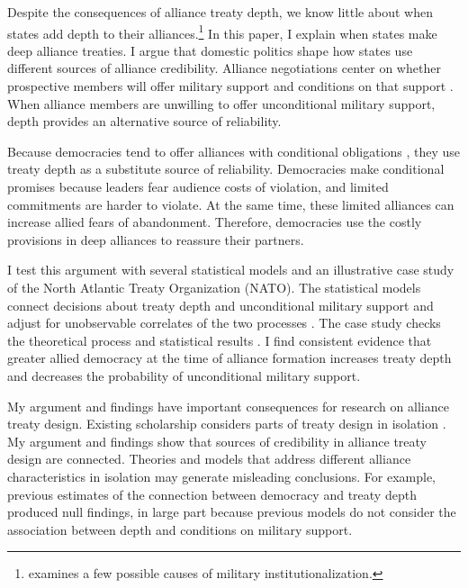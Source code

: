 \documentclass[12pt]{article}
\begin{document}
Despite the consequences of alliance treaty depth, we know little about when states add depth to their alliances.\footnote{\citet{Mattes2012} examines a few possible causes of military institutionalization.}
In this paper, I explain when states make deep alliance treaties.
I argue that domestic politics shape how states use different sources of alliance credibility. 
Alliance negotiations center on whether prospective members will offer military support and conditions on that support \citep{Poast2019a}. 
When alliance members are unwilling to offer unconditional military support, depth provides an alternative source of reliability.%


Because democracies tend to offer alliances with conditional obligations \citep{Mattes2012, Chibaetal2015}, they use treaty depth as a substitute source of reliability. 
Democracies make conditional promises because leaders fear audience costs of violation, and limited commitments are harder to violate.
At the same time, these limited alliances can increase allied fears of abandonment. 
Therefore, democracies use the costly provisions in deep alliances to reassure their partners.   


I test this argument with several statistical models and an illustrative case study of the North Atlantic Treaty Organization (NATO).
The statistical models connect decisions about treaty depth and unconditional military support and adjust for unobservable correlates of the two processes \citep{Braumoelleretal2018}. 
The case study checks the theoretical process and statistical results \citep{SeawrightGerring2008, Seawright2016}. 
I find consistent evidence that greater allied democracy at the time of alliance formation increases treaty depth and decreases the probability of unconditional military support. 


My argument and findings have important consequences for research on alliance treaty design. 
Existing scholarship considers parts of treaty design in isolation \citep{Benson2012, Mattes2012, Chibaetal2015}. 
My argument and findings show that sources of credibility in alliance treaty design are connected. 
Theories and models that address different alliance characteristics in isolation may generate misleading conclusions. 
For example, previous estimates of the connection between democracy and treaty depth produced null findings, in large part because previous models do not consider the association between depth and conditions on military support. 
\end{document}

